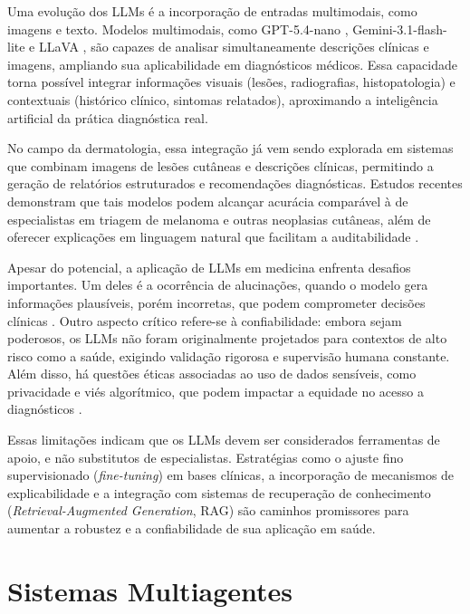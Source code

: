 Uma evolução dos LLMs é a incorporação de entradas multimodais, como imagens e texto. Modelos multimodais, como GPT-5.4-nano \cite{openai2025gpt5nano}, Gemini-3.1-flash-lite \cite{google2025gemini31} e LLaVA \cite{liu2023visual}, são capazes de analisar simultaneamente descrições clínicas e imagens, ampliando sua aplicabilidade em diagnósticos médicos. Essa capacidade torna possível integrar informações visuais (lesões, radiografias, histopatologia) e contextuais (histórico clínico, sintomas relatados), aproximando a inteligência artificial da prática diagnóstica real.

No campo da dermatologia, essa integração já vem sendo explorada em sistemas que combinam imagens de lesões cutâneas e descrições clínicas, permitindo a geração de relatórios estruturados e recomendações diagnósticas. Estudos recentes demonstram que tais modelos podem alcançar acurácia comparável à de especialistas em triagem de melanoma e outras neoplasias cutâneas, além de oferecer explicações em linguagem natural que facilitam a auditabilidade \cite{nori2023capabilitiesgpt4medicalchallenge,vashisht2024umassbionlpmediqam3g2024dermprompt}.

Apesar do potencial, a aplicação de LLMs em medicina enfrenta desafios importantes. Um deles é a ocorrência de alucinações, quando o modelo gera informações plausíveis, porém incorretas, que podem comprometer decisões clínicas \cite{rao2023large}. Outro aspecto crítico refere-se à confiabilidade: embora sejam poderosos, os LLMs não foram originalmente projetados para contextos de alto risco como a saúde, exigindo validação rigorosa e supervisão humana constante. Além disso, há questões éticas associadas ao uso de dados sensíveis, como privacidade e viés algorítmico, que podem impactar a equidade no acesso a diagnósticos \cite{tang2023evaluating}.

Essas limitações indicam que os LLMs devem ser considerados ferramentas de apoio, e não substitutos de especialistas. Estratégias como o ajuste fino supervisionado (\textit{fine-tuning}) em bases clínicas, a incorporação de mecanismos de explicabilidade e a integração com sistemas de recuperação de conhecimento (\textit{Retrieval-Augmented Generation}, RAG) são caminhos promissores para aumentar a robustez e a confiabilidade de sua aplicação em saúde.


\section{Sistemas Multiagentes}

